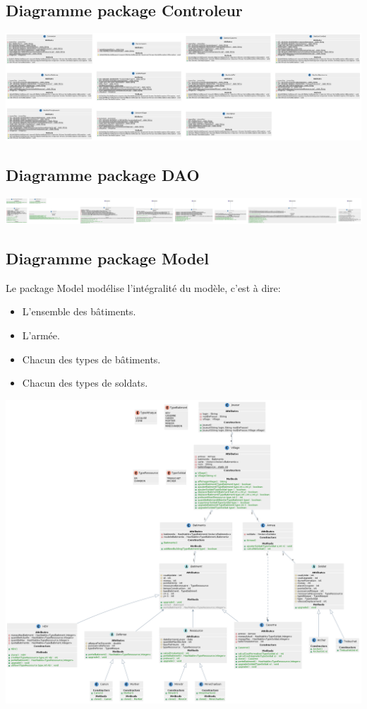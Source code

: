         \subsection{Diagramme package Controleur}
            \includegraphics[scale=0.4]{ressources/images/ClassesControleur.png}
        \subsection{Diagramme package DAO}
            \includegraphics[scale=0.4]{ressources/images/Classesdao.png}
        \subsection{Diagramme package Model}
            Le package Model modélise l'intégralité du modèle, c'est à dire:
            \begin{itemize}
                \item L'ensemble des bâtiments.
                \item L'armée.
                \item Chacun des types de bâtiments.
                \item Chacun des types de soldats.
            \end{itemize}
            \includegraphics[scale=0.3]{ressources/images/ClassesModel.png}
